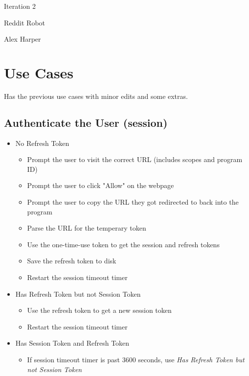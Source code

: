 \documentclass[12pt]{article}
\begin{document}
\begin{titlepage}
	\centering
	{\Huge Iteration 2\par}
	\vspace{0.25in}
	{\Large Reddit Robot\par}
	\vspace{2in}
	{Alex Harper\par}
	\newpage
\end{titlepage}
\tableofcontents
\newpage
{}

\section{Use Cases}

Has the previous use cases with minor edits and some extras.

\hypertarget{Authenticate the User (session)}{
\subsection{Authenticate the User (session)}
}
\begin{itemize}
	\item No Refresh Token
	\begin{itemize}
		\item Prompt the user to visit the correct URL (includes scopes and program ID)
		\item Prompt the user to click "Allow" on the webpage
		\item Prompt the user to copy the URL they got redirected to back into the program
		\item Parse the URL for the temperary token
		\item Use the one-time-use token to get the session and refresh tokens
		\item Save the refresh token to disk
		\item Restart the session timeout timer
	\end{itemize}

	\item Has Refresh Token but not Session Token
	\begin{itemize}
		\item Use the refresh token to get a new session token
		\item Restart the session timeout timer
	\end{itemize}

	\item Has Session Token and Refresh Token
	\begin{itemize}
		\item If session timeout timer is past 3600 seconds, use \textit{Has Refresh Token but not Session Token}
	\end{itemize}
\end{itemize}
\end{document}
